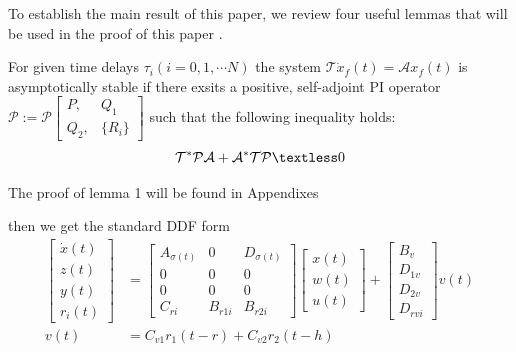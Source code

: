 \documentclass[twocolumn]{autart}    %
\begin{document}
To establish the main result of this paper, we review four useful lemmas that will be used in the proof of this paper .
\begin{lem}
    [c]For given time delays $\tau_{i}(i=0,1,\cdots N)$ the system $\mathcal{T}\dot{x}_{f}(t) = \mathcal{A}x_{f}(t)$ is asymptotically stable 
    if there exsits a positive, self-adjoint PI operator $\mathcal{P}:=\mathcal{P}\begin{bmatrix}
        P,&Q_{1}\\
        Q_{2},&\{R_{i}\}
    \end{bmatrix}$ such that the following inequality holds:
    \begin{equation}
        \mathcal{T}^{*}\mathcal{P}\mathcal{A}+\mathcal{A}^{*}\mathcal{T}\mathcal{P} \textless 0
    \end{equation}
\end{lem}
    The proof of lemma 1 will be found in Appendixes

\begin{lem}[c]
    then we get the standard DDF form
\begin{equation}
    \begin{aligned}
        \begin{bmatrix}
            \dot{x}(t) \\
            z(t) \\
            y(t) \\
            r_{i}(t)
        \end{bmatrix} & = \begin{bmatrix}
            A_{\sigma(t)} & 0 & D_{\sigma(t)}\\
            0 & 0 & 0\\
            0 & 0 & 0\\
            C_{ri} & B_{r1i} & B_{r2i}
        \end{bmatrix}\begin{bmatrix}
            x(t) \\
            w(t) \\
            u(t) 
        \end{bmatrix} 
        +  \begin{bmatrix}
            B_{v} \\
            D_{1v} \\
            D_{2v} \\
            D_{rvi}
        \end{bmatrix}v(t)\\
        v(t) &= C_{v1}r_{1}(t-r) + C_{v2}r_{2}(t-h)
    \end{aligned}
\end{equation}
\end{lem}
\end{document}
